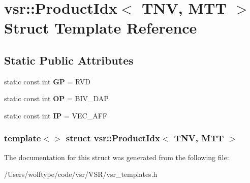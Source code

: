 \hypertarget{structvsr_1_1_product_idx_3_01_t_n_v_00_01_m_t_t_01_4}{\section{vsr\-:\-:Product\-Idx$<$ T\-N\-V, M\-T\-T $>$ Struct Template Reference}
\label{structvsr_1_1_product_idx_3_01_t_n_v_00_01_m_t_t_01_4}
}
\subsection*{Static Public Attributes}
\begin{DoxyCompactItemize}
\item 
\hypertarget{structvsr_1_1_product_idx_3_01_t_n_v_00_01_m_t_t_01_4_aa7a524a52c402b2796b522b5846bbe17}{static const int {\bfseries G\-P} = R\-V\-D}\label{structvsr_1_1_product_idx_3_01_t_n_v_00_01_m_t_t_01_4_aa7a524a52c402b2796b522b5846bbe17}

\item 
\hypertarget{structvsr_1_1_product_idx_3_01_t_n_v_00_01_m_t_t_01_4_acff0b52a099a8125e7f5d7a64006258b}{static const int {\bfseries O\-P} = B\-I\-V\-\_\-\-D\-A\-P}\label{structvsr_1_1_product_idx_3_01_t_n_v_00_01_m_t_t_01_4_acff0b52a099a8125e7f5d7a64006258b}

\item 
\hypertarget{structvsr_1_1_product_idx_3_01_t_n_v_00_01_m_t_t_01_4_a30f31225ddcc0489c3002007d858f93b}{static const int {\bfseries I\-P} = V\-E\-C\-\_\-\-A\-F\-F}\label{structvsr_1_1_product_idx_3_01_t_n_v_00_01_m_t_t_01_4_a30f31225ddcc0489c3002007d858f93b}

\end{DoxyCompactItemize}
\subsubsection*{template$<$$>$ struct vsr\-::\-Product\-Idx$<$ T\-N\-V, M\-T\-T $>$}



The documentation for this struct was generated from the following file\-:\begin{DoxyCompactItemize}
\item 
/\-Users/wolftype/code/vsr/\-V\-S\-R/vsr\-\_\-templates.\-h\end{DoxyCompactItemize}
